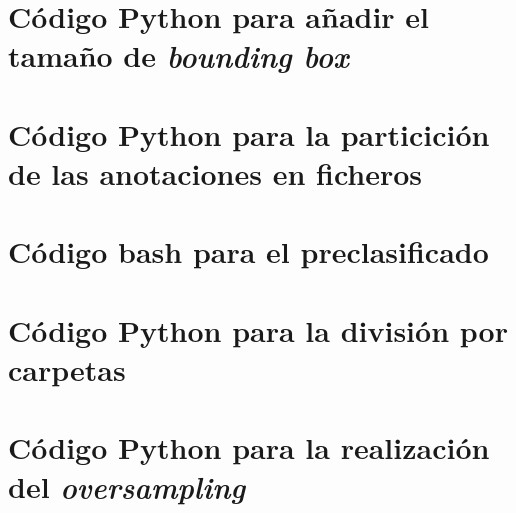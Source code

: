 \documentclass[12pt]{report} %
\begin{document}
    \section*{Código Python para añadir el tamaño de \textit{bounding box}}
    \label{mod_ball}
    

    \section*{Código Python para la particición de las anotaciones en ficheros}
    

    \section*{Código bash para el preclasificado}
    \label{preclasificado}
    

    \section*{Código Python para la división por carpetas}
    \label{div_carpetas}
    

    \section*{Código Python para la realización del \textit{oversampling}}
    \label{div_carpetas}
    
\end{document}
